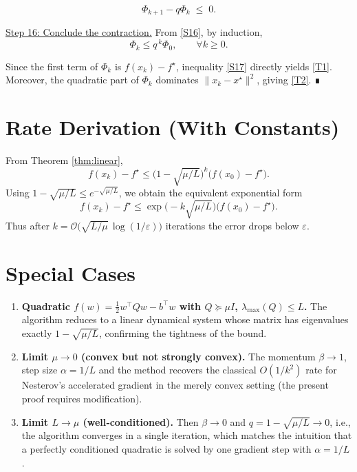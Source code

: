 \documentclass{article}
\begin{document}
\[
\Phi_{k+1} - q\Phi_k \;\le\; 0 .
\tag{S16}
\]

\noindent\underline{Step 16: Conclude the contraction.}  
From \eqref{S16}, by induction,
\[
\Phi_k \le q^{\,k}\Phi_0,\qquad \forall k\ge 0.
\tag{S17}
\]

Since the first term of $\Phi_k$ is $f(x_k)-f^\star$, inequality \eqref{S17} directly yields \eqref{T1}. Moreover, the quadratic part of $\Phi_k$ dominates $\|x_k-x^\star\|^2$, giving \eqref{T2}. ∎

\section*{Rate Derivation (With Constants)}
From Theorem \ref{thm:linear},
\[
f(x_k)-f^\star \le \bigl(1-\sqrt{\mu/L}\bigr)^k \bigl(f(x_0)-f^\star\bigr).
\]
Using $1-\sqrt{\mu/L}\le e^{-\sqrt{\mu/L}}$, we obtain the equivalent exponential form
\[
f(x_k)-f^\star \le \exp\!\bigl(-k\sqrt{\mu/L}\bigr)\bigl(f(x_0)-f^\star\bigr).
\]
Thus after $k = \mathcal{O}\bigl(\sqrt{L/\mu}\,\log(1/\varepsilon)\bigr)$ iterations the error drops below $\varepsilon$.

\section*{Special Cases}
\begin{enumerate}[label=\alph*.]
\item \textbf{Quadratic $f(w)=\tfrac12 w^\top Q w - b^\top w$ with $Q\succeq \mu I$, $\lambda_{\max}(Q)\le L$.}  
The algorithm reduces to a linear dynamical system whose matrix has eigenvalues exactly $1-\sqrt{\mu/L}$, confirming the tightness of the bound.
\item \textbf{Limit $\mu\to 0$ (convex but not strongly convex).}  
The momentum $\beta\to 1$, step size $\alpha=1/L$ and the method recovers the classical $O(1/k^2)$ rate for Nesterov’s accelerated gradient in the merely convex setting (the present proof requires modification).
\item \textbf{Limit $L\to\mu$ (well‑conditioned).}  
Then $\beta\to 0$ and $q=1-\sqrt{\mu/L}\to 0$, i.e., the algorithm converges in a single iteration, which matches the intuition that a perfectly conditioned quadratic is solved by one gradient step with $\alpha=1/L$.
\end{enumerate}
\end{document}
